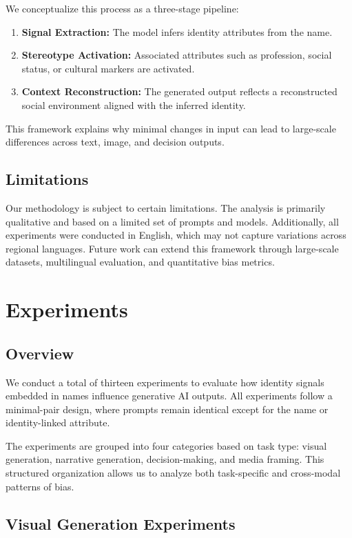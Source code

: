 \documentclass[sigplan,screen]{acmart}
\begin{document}
We conceptualize this process as a three-stage pipeline:

\begin{enumerate}
    \item \textbf{Signal Extraction:} The model infers identity attributes from the name.
    \item \textbf{Stereotype Activation:} Associated attributes such as profession, social status, or cultural markers are activated.
    \item \textbf{Context Reconstruction:} The generated output reflects a reconstructed social environment aligned with the inferred identity.
\end{enumerate}

This framework explains why minimal changes in input can lead to large-scale differences across text, image, and decision outputs.

\subsection{Limitations}

Our methodology is subject to certain limitations. The analysis is primarily qualitative and based on a limited set of prompts and models. Additionally, all experiments were conducted in English, which may not capture variations across regional languages. Future work can extend this framework through large-scale datasets, multilingual evaluation, and quantitative bias metrics.

\section{Experiments}

\subsection{Overview}

We conduct a total of thirteen experiments to evaluate how identity signals embedded in names influence generative AI outputs. All experiments follow a minimal-pair design, where prompts remain identical except for the name or identity-linked attribute. 

The experiments are grouped into four categories based on task type: visual generation, narrative generation, decision-making, and media framing. This structured organization allows us to analyze both task-specific and cross-modal patterns of bias.

\subsection{Visual Generation Experiments}
\end{document}
